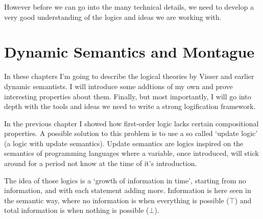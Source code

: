 \documentclass[12pt]{article}
\let\stdsection\section
\renewcommand\section{\newpage\stdsection}
\begin{document}
However before we can go into the many technical details, we need to develop a very good understanding of the logics and ideas we are working with.

\section{Dynamic Semantics and Montague}


In these chapters I'm going to describe the logical theories by Visser and earlier dynamic semantists. I will introduce some addtions of my own and prove interesting properties about them. Finally, but most importantly, I will go into depth with the tools and ideas we need to write a strong logification framework.

In the previous chapter I showed how first-order logic lacks certain compositional properties. A possible solution to this problem is to use a so called `update logic' (a logic with update semantics). Update semantics are logics inspired on the semantics of programming languages where a variable, once introduced, will stick around for a period not know at the time of it's introduction.

The idea of those logics is a `growth of information in time', starting from no information, and with each statement adding more. Information is here seen in the semantic way, where no information is when everything is possible ($\top$) and total information is when nothing is possible ($\bot$).
\end{document}
